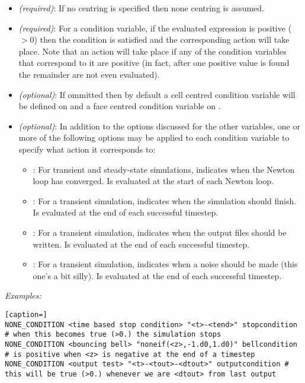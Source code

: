 \begin{itemize}
\item {} \emph{(required)}:  If no centring is specified then none centring is assumed.
\item {} \emph{(required)}:  For a condition variable, if the evaluated expression is positive ($>0$) then the condition is satisfied and the corresponding action will take place.  Note that an action will take place if any of the condition variables that correspond to it are positive (in fact, after one positive value is found the remainder are not even evaluated).
\item {} \emph{(optional)}:  If ommitted then by default a cell centred condition variable will be defined on  and a face centred condition variable on .
\item {} \emph{(optional)}:  In addition to the options discussed for the other variables, one or more of the following options may be applied to each condition variable to specify what action it corresponds to:
\begin{itemize}
\item {}:  For transient and steady-state simulations, indicates when the Newton loop has converged.  Is evaluated at the start of each Newton loop.
\item {}:  For a transient simulation, indicates when the simulation should finish.  Is evaluated at the end of each successful timestep.
\item {}:  For a transient simulation, indicates when the  output files should be written.  Is evaluated at the end of each successful timestep.
\item {}:  For a transient simulation, indicates when a noise should be made (this one's a bit silly).  Is evaluated at the end of each successful timestep.
\end{itemize}
\end{itemize}

\emph{Examples:}

\begin{lstlisting}[caption=]
NONE_CONDITION <time based stop condition> "<t>-<tend>" stopcondition # when this becomes true (>0.) the simulation stops
NONE_CONDITION <bouncing bell> "noneif(<z>,-1.d0,1.d0)" bellcondition # is positive when <z> is negative at the end of a timestep
NONE_CONDITION <output test> "<t>-<tout>-<dtout>" outputcondition # this will be true (>0.) whenever we are <dtout> from last output
\end{lstlisting}

